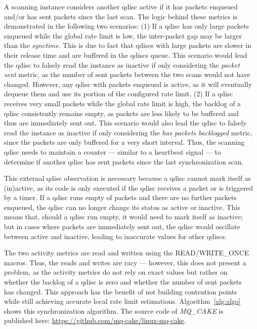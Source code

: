 A scanning instance considers another qdisc active if it has packets enqueued and/or has sent packets since the last scan.
%
The logic behind these metrics is demonstrated in the following two scenarios:
%
(1) If a qdisc has only large packets enqueued while the global rate limit is low, the inter-packet gap may be larger than the \textit{synctime}.
This is due to fact that qdiscs with large packets are slower in their release time and are buffered in the qdiscs queue.
%
This scenario would lead the qdisc to falsely read the instance as inactive if only considering the \textit{packet sent} metric, as the number of sent packets between the two scans  would not have changed.
%
However, any qdisc with packets enqueued is active, as it will eventually dequeue them and use its portion of the configured rate limit.
%
(2) If a qdisc receives very small packets while the global rate limit is high, the backlog of a qdisc consistently remains empty, as packets are less likely to be buffered and thus are immediately sent out.
%
This scenario would also lead the qdisc to falsely read the instance as inactive if only considering the \textit{has packets backlogged} metric, since the packets are only buffered for a very short interval.
%
Thus, the scanning qdisc needs to maintain a counter --- similar to a heartbeat signal --- to determine if another qdisc has sent packets since the last synchronization scan.
%

This external qdisc observation is necessary because a qdisc cannot mark itself as (in)active, as its code is only executed if the qdisc receives a packet or is triggered by a timer.
%
If a qdisc runs empty of packets and there are no further packets enqueued, the qdisc can no longer change its status as active or inactive.
%
This means that, should a qdisc run empty, it would need to mark itself as inactive; but in cases where packets are immediately sent out, the qdisc would oscillate
between active and inactive, leading to inaccurate values for other qdiscs. 
%

The two activity metrics are read and written using the READ/WRITE\_ONCE macros.
%
Thus, the reads and writes are racy --- however, this does not present a problem, as the activity metrics do not rely on exact values but rather on whether the backlog of a qdisc is zero and whether the number of sent packets has changed.
%
This approach has the benefit of not building contention points while still achieving accurate local rate limit estimations.
%
Algorithm~\ref{alg:algo} shows this synchronization algorithm.
%
The source code of \textit{MQ\_CAKE} is published here: \url{https://github.com/mq-cake/linux-mq-cake}.

